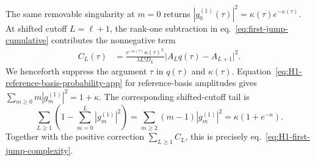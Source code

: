 \documentclass[a4paper,11pt]{article}
\def\ee{e}%
\theoremstyle{definition}
\theoremstyle{remark}
\newcommand{\ee}{\mathrm e}
\begin{document}
The same removable singularity at $m=0$ returns
$
   |g_0^{(1)}(\tau)|^2=\kappa(\tau)\ee^{-\kappa(\tau)}.
$
At shifted cutoff \(L=\ell+1\), the rank-one subtraction in eq.~\eqref{eq:first-jump-cumulative} contributes the nonnegative term
\begin{equation}
\begin{aligned}
   C_L(\tau)
   &=\frac{\ee^{-\kappa(\tau)}\kappa(\tau)^L}
           {\lambda L!D_L}
     \bigl|A_Lq(\tau)-A_{L+1}\bigr|^2 .
\end{aligned}
   \label{eq:H1-Christoffel-correction-app}
\end{equation}
We henceforth suppress the argument $\tau$ in $q(\tau)$ and $\kappa(\tau)$. Equation~\eqref{eq:H1-reference-basis-probability-app} for reference-basis amplitudes gives $\sum_{m\ge0}m|g_m^{(1)}|^2=1+\kappa$. The corresponding shifted-cutoff tail is
\begin{equation}
   \sum_{L\ge1}\left(1-\sum_{m=0}^{L}|g_m^{(1)}|^2\right)
   =
   \sum_{m\ge2}(m-1)|g_m^{(1)}|^2
   =
   \kappa(1+\ee^{-\kappa}).
   \label{eq:H1-reference-tail-app}
\end{equation}
Together with the positive correction $\sum_{L\ge1}C_L$, this is precisely eq.~\eqref{eq:H1-first-jump-complexity}.
\end{document}
